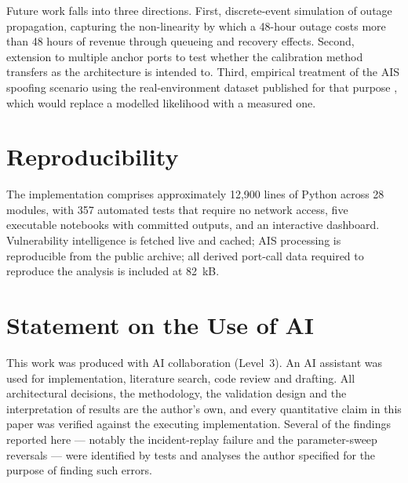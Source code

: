 \documentclass[conference]{IEEEtran}
\begin{document}
Future work falls into three directions. First, discrete-event simulation of outage
propagation, capturing the non-linearity by which a 48-hour outage costs more than
48 hours of revenue through queueing and recovery effects. Second, extension to
multiple anchor ports to test whether the calibration method transfers as the
architecture is intended to. Third, empirical treatment of the AIS spoofing
scenario using the real-environment dataset published for that purpose
\cite{viskydataset}, which would replace a modelled likelihood with a measured one.

\section*{Reproducibility}

The implementation comprises approximately 12{,}900 lines of Python across 28
modules, with 357 automated tests that require no network access, five executable
notebooks with committed outputs, and an interactive dashboard. Vulnerability
intelligence is fetched live and cached; AIS processing is reproducible from the
public archive; all derived port-call data required to reproduce the analysis is
included at 82~kB.

\section*{Statement on the Use of AI}

This work was produced with AI collaboration (Level~3). An AI assistant was used
for implementation, literature search, code review and drafting. All architectural
decisions, the methodology, the validation design and the interpretation of results
are the author's own, and every quantitative claim in this paper was verified
against the executing implementation. Several of the findings reported here ---
notably the incident-replay failure and the parameter-sweep reversals --- were
identified by tests and analyses the author specified for the purpose of finding
such errors.
\end{document}
